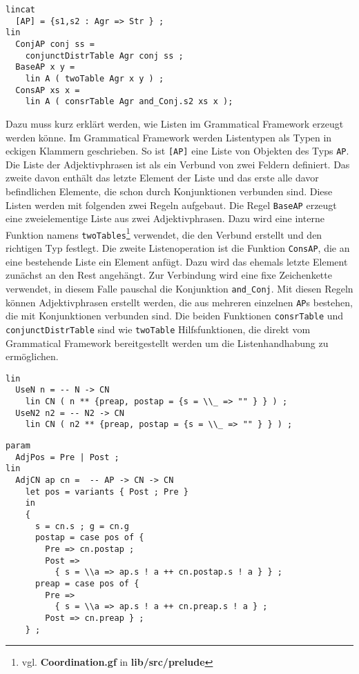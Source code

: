 \begin{lstlisting}[float=h!tp,caption={Der Listentyp Für Adjektivphrasen und die Funktionen zum Erstellen und Verwenden (vgl. \textbf{ConjunctionLat.gf}},label={GF-Conjunction-AP}]
lincat
  [AP] = {s1,s2 : Agr => Str } ;
lin
  ConjAP conj ss = 
    conjunctDistrTable Agr conj ss ;
  BaseAP x y = 
    lin A ( twoTable Agr x y ) ;
  ConsAP xs x = 
    lin A ( consrTable Agr and_Conj.s2 xs x );
\end{lstlisting}
Dazu muss kurz erklärt werden, wie Listen im Grammatical Framework erzeugt werden könne. Im Grammatical Framework werden Listentypen als Typen in eckigen Klammern geschrieben. So ist \texttt{[AP]} eine Liste von Objekten des Typs \texttt{AP}. Die Liste der Adjektivphrasen ist als ein Verbund von zwei Feldern definiert. Das zweite davon enthält das letzte Element der Liste und das erste alle davor befindlichen Elemente, die schon durch Konjunktionen verbunden sind. Diese Listen werden mit folgenden zwei Regeln aufgebaut. Die Regel \texttt{BaseAP} erzeugt eine zweielementige Liste aus zwei Adjektivphrasen. Dazu wird eine interne Funktion namens \texttt{twoTables}\footnote{vgl. \textbf{Coordination.gf} in \textbf{lib/src/prelude}} verwendet, die den Verbund erstellt und den richtigen Typ festlegt. Die zweite Listenoperation ist die Funktion \texttt{ConsAP}, die an eine bestehende Liste ein Element anfügt. Dazu wird das ehemals letzte Element zunächst an den Rest angehängt. Zur Verbindung wird eine fixe Zeichenkette verwendet, in diesem Falle pauschal die Konjunktion \texttt{and\_Conj}. Mit diesen Regeln können Adjektivphrasen erstellt werden, die aus mehreren einzelnen \texttt{AP}s bestehen, die mit Konjunktionen verbunden sind. Die beiden Funktionen \texttt{consrTable} und \texttt{conjunctDistrTable} sind wie \texttt{twoTable} Hilfsfunktionen, die direkt vom Grammatical Framework bereitgestellt werden um die Listenhandhabung zu ermöglichen. \par
\begin{lstlisting}[float=h!tp,caption={Die Syntaxregeln \texttt{UseN} und \texttt{UseN2} um ein Nomen als \texttt{CN} zu verwenden (vgl. \textbf{NounLat.gf}},label={GF-Noun-UseNs}]
lin
  UseN n = -- N -> CN
    lin CN ( n ** {preap, postap = {s = \\_ => "" } } ) ;
  UseN2 n2 = -- N2 -> CN
    lin CN ( n2 ** {preap, postap = {s = \\_ => "" } } ) ;
\end{lstlisting}
\begin{lstlisting}[float=h!tp,caption={Die Syntaxregeln \texttt{AdjCN} um ein Common Noun mit einer Adjektivphrase zu erweitern (vgl. \textbf{NounLat.gf}},label={GF-Noun-AdjCN}]
param
  AdjPos = Pre | Post ;
lin
  AdjCN ap cn =  -- AP -> CN -> CN
    let pos = variants { Post ; Pre }
    in
    {
      s = cn.s ; g = cn.g
      postap = case pos of { 
        Pre => cn.postap ; 
        Post => 
          { s = \\a => ap.s ! a ++ cn.postap.s ! a } } ;
      preap = case pos of { 
        Pre => 
          { s = \\a => ap.s ! a ++ cn.preap.s ! a } ; 
        Post => cn.preap } ;
    } ;
\end{lstlisting}
